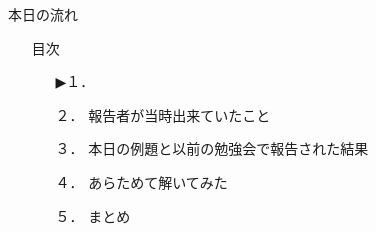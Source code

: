 \begin{frame}{本日の流れ}
  \begin{itemize}
     \item[] 目次
     \begin{itemize}[itemsep=1.3ex, leftmargin=1cm]
        \item[▶１．] 
        \item[２．] 報告者が当時出来ていたこと
        \item[３．] 本日の例題と以前の勉強会で報告された結果
        \item[４．] あらためて解いてみた
        \item[５．] まとめ
     \end{itemize}
  \end{itemize}
\end{frame}
